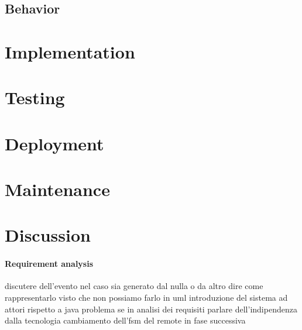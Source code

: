 \documentclass{llncs}
\newcommand{\labelsec}[1]{\label{sec:#1}}
\begin{document}
\subsection{Behavior}
\section{Implementation}
\labelsec{Implementation}

\section{Testing}
\labelsec{testing}

\section{Deployment}
\labelsec{Deployment}

\section{Maintenance}
\labelsec{Maintenance}

\section{Discussion}
\paragraph{Requirement analysis}

\labelsec{Discussion}
discutere dell'evento nel caso sia generato dal nulla o da altro
dire come rappresentarlo visto che non possiamo farlo in uml
introduzione del sistema ad attori rispetto a java
problema se in analisi dei requisiti parlare dell'indipendenza dalla tecnologia
cambiamento dell'fsm del remote in fase successiva
\newpage
\appendix
\end{document}
